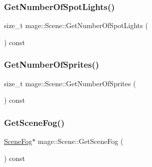 \hypertarget{classmage_1_1_scene_af7bdbd447a50beb83ae5573f7e5505db}{}\label{classmage_1_1_scene_af7bdbd447a50beb83ae5573f7e5505db} 
\subsubsection{\texorpdfstring{Get\+Number\+Of\+Spot\+Lights()}{GetNumberOfSpotLights()}}
{\footnotesize\ttfamily size\+\_\+t mage\+::\+Scene\+::\+Get\+Number\+Of\+Spot\+Lights (\begin{DoxyParamCaption}{ }\end{DoxyParamCaption}) const\hspace{0.3cm}{\ttfamily [noexcept]}}

\hypertarget{classmage_1_1_scene_a124042421abfee563342e50032d4051f}{}\label{classmage_1_1_scene_a124042421abfee563342e50032d4051f} 
\subsubsection{\texorpdfstring{Get\+Number\+Of\+Sprites()}{GetNumberOfSprites()}}
{\footnotesize\ttfamily size\+\_\+t mage\+::\+Scene\+::\+Get\+Number\+Of\+Sprites (\begin{DoxyParamCaption}{ }\end{DoxyParamCaption}) const\hspace{0.3cm}{\ttfamily [noexcept]}}

\hypertarget{classmage_1_1_scene_a1f21d92feb659477ceb4642322fa2f0c}{}\label{classmage_1_1_scene_a1f21d92feb659477ceb4642322fa2f0c} 
\subsubsection{\texorpdfstring{Get\+Scene\+Fog()}{GetSceneFog()}}
{\footnotesize\ttfamily \hyperlink{classmage_1_1_scene_fog}{Scene\+Fog}$\ast$ mage\+::\+Scene\+::\+Get\+Scene\+Fog (\begin{DoxyParamCaption}{ }\end{DoxyParamCaption}) const\hspace{0.3cm}{\ttfamily [noexcept]}}

